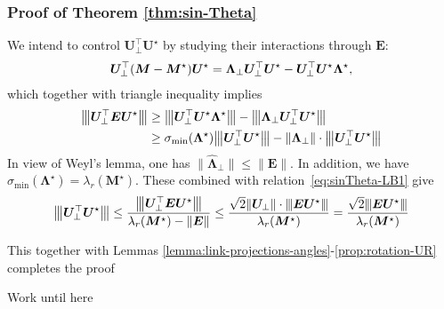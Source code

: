 \documentclass[compress,
mathserif,wide,%
]{beamer}
\begin{document}
\begin{frame}
\frametitle{Proof of  Theorem \ref{thm:sin-Theta}}


	We intend to control $\bm{U}_{\perp}^{\top} \bm{U}^\star$ by studying their interactions through $\bm{E}$:	
\begin{align}
	\bm{U}_{\perp}^{\top} ({\bm M} - {\bm M}^\star) {\bm U}^\star = \bm{\Lambda}_{\perp}\bm{U}_{\perp}^{\top}\bm{U}^{\star}-\bm{U}_{\perp}^{\top}\bm{U}^{\star}\bm{\Lambda}^{\star}, \label{eq:sylvester}
\end{align}
which together with triangle inequality implies
\begin{align} \label{eq:sinTheta-LB1}
\vertiiibig{\bm{U}_{\perp}^{\top}\bm{E}\bm{U}^\star} & \geq \vertiiibig{\bm{U}_{\perp}^{\top}\bm{U}^{\star}\bm{\Lambda}^{\star}} - \vertiiibig{\bm{\Lambda}_{\perp}\bm{U}_{\perp}^{\top}\bm{U}^{\star}} \nonumber \\
	& \geq  \sigma_{\min}(\bm{\Lambda}^\star)  \vertiiibig{\bm{U}_{\perp}^{\top}\bm{U}^{\star}}- \|\bm{\Lambda}_{\perp}\| \cdot \vertiiibig{\bm{U}_{\perp}^{\top}\bm{U}^{\star}}
\end{align}
%
	In view of Weyl's lemma, one has $\|\hat{\bm{\Lambda}}_{\perp}\|\leq\|\bm{E}\|$. In addition, we have $ \sigma_{\min}(\bm{\Lambda}^\star) = \lambda_{r}(\bm{M}^\star)$. These combined with relation~\eqref{eq:sinTheta-LB1} give
%
\[
	{\big\vert\kern-0.25ex\big\vert\kern-0.25ex\big\vert \bm{U}_{\perp}^{\top}\bm{U}^{\star} \big\vert\kern-0.25ex\big\vert\kern-0.25ex\big\vert}
	\leq\frac{{\big\vert\kern-0.25ex\big\vert\kern-0.25ex\big\vert \bm{U}_{\perp}^{\top}\bm{E}\bm{U}^\star \big\vert\kern-0.25ex\big\vert\kern-0.25ex\big\vert} }{\lambda_{r}(\bm{M}^\star) - \|\bm{E}\|}
	\leq\frac{ \sqrt{2} \| \bm{U}_{\perp} \| \cdot {\left\vert\kern-0.25ex\left\vert\kern-0.25ex\left\vert   \bm{E} \bm{U}^{\star}  \right\vert\kern-0.25ex\right\vert\kern-0.25ex\right\vert}}{\lambda_{r}(\bm{M}^{\star})}
	= \frac{  \sqrt{2}  {\left\vert\kern-0.25ex\left\vert\kern-0.25ex\left\vert   \bm{E} \bm{U}^{\star}  \right\vert\kern-0.25ex\right\vert\kern-0.25ex\right\vert} }{\lambda_{r}(\bm{M}^{\star})}
\]

This together with Lemmas \ref{lemma:link-projections-angles}-\ref{prop:rotation-UR} completes the proof


\end{frame}



\begin{frame}
	Work until here
\end{frame}
\end{document}
